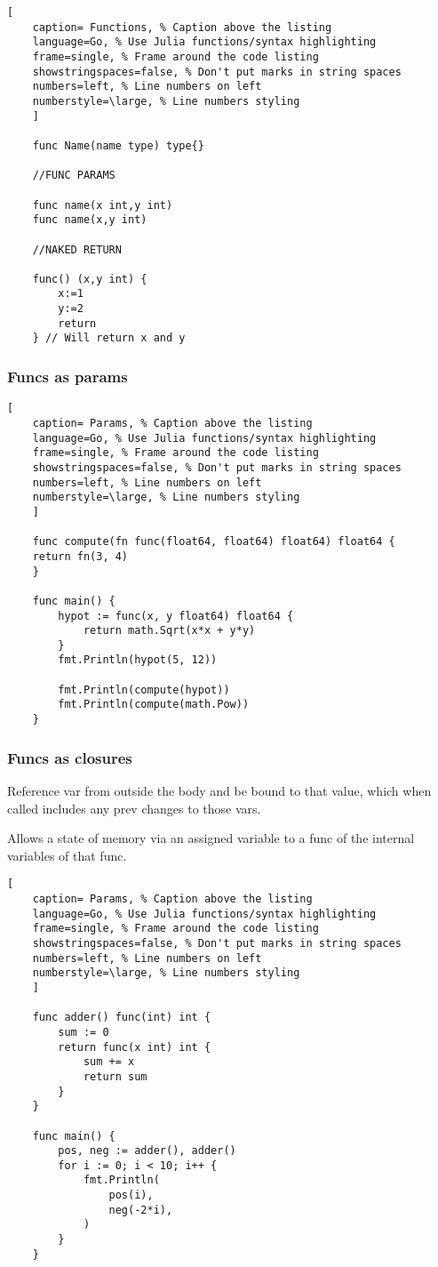 \documentclass[11pt]{scrartcl} %
\begin{document}
\begin{lstlisting}[
	caption= Functions, % Caption above the listing
	language=Go, % Use Julia functions/syntax highlighting
	frame=single, % Frame around the code listing
	showstringspaces=false, % Don't put marks in string spaces
	numbers=left, % Line numbers on left
	numberstyle=\large, % Line numbers styling
	]

	func Name(name type) type{}

	//FUNC PARAMS

	func name(x int,y int)
	func name(x,y int)

	//NAKED RETURN

	func() (x,y int) {
		x:=1
		y:=2
		return
	} // Will return x and y 

\end{lstlisting}

\subsubsection{Funcs as params}

\begin{lstlisting}[
	caption= Params, % Caption above the listing
	language=Go, % Use Julia functions/syntax highlighting
	frame=single, % Frame around the code listing
	showstringspaces=false, % Don't put marks in string spaces
	numbers=left, % Line numbers on left
	numberstyle=\large, % Line numbers styling
	]

	func compute(fn func(float64, float64) float64) float64 {
	return fn(3, 4)
	}

	func main() {
		hypot := func(x, y float64) float64 {
			return math.Sqrt(x*x + y*y)
		}
		fmt.Println(hypot(5, 12))

		fmt.Println(compute(hypot))
		fmt.Println(compute(math.Pow))
	}

\end{lstlisting}

\subsubsection{Funcs as closures}

Reference var from outside the body and be bound to that value, which when called
includes any prev changes to those vars.

Allows a state of memory via an assigned variable to a func of the internal variables of that func.

\begin{lstlisting}[
	caption= Params, % Caption above the listing
	language=Go, % Use Julia functions/syntax highlighting
	frame=single, % Frame around the code listing
	showstringspaces=false, % Don't put marks in string spaces
	numbers=left, % Line numbers on left
	numberstyle=\large, % Line numbers styling
	]

	func adder() func(int) int {
		sum := 0
		return func(x int) int {
			sum += x
			return sum
		}
	}
	
	func main() {
		pos, neg := adder(), adder()
		for i := 0; i < 10; i++ {
			fmt.Println(
				pos(i),
				neg(-2*i),
			)
		}
	}

\end{lstlisting}
\end{document}
